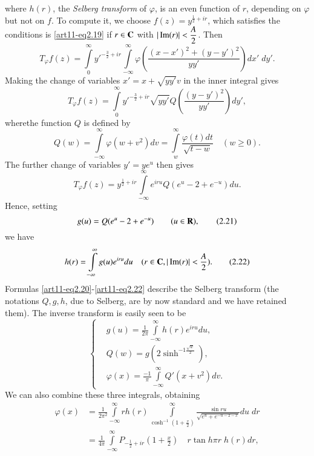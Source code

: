where $h(r)$, the \textit{Selberg transform} of $\varphi$, is an even function of $r$, depending on $\varphi$ but not on $f$. To compute it, we choose $f(z) = y^{\frac{1}{2} + ir}$, which satisfies the conditions is \eqref{art11-eq2.19} if $r \in \mathbf{C}$ with $|\operatorname{Im} (r)| <\dfrac{A}{2}$. Then 
$$
T_\varphi f(z) = \int\limits^\infty_0 y'^{-\frac{3}{2} + ir} \int\limits^\infty_{-\infty} \varphi  \left(\frac{(x-x')^2 + (y-y')^2}{yy'} \right) dx' \; dy'. 
$$
Making the change of variables $x' = x + \sqrt{yy'} v$ in the inner integral gives 
$$
T_\varphi f(z) = \int\limits^\infty_0 y'^{-\frac{3}{2} + ir} \sqrt{yy'} Q \left(\frac{(y-y')^2}{yy'} \right) dy',
$$
where\pageoriginale the function $Q$ is defined by 
\begin{equation*}
Q(w) = \int\limits^\infty_{-\infty} \varphi (w + v^2) dv = \int\limits^\infty_{w}  \frac{\varphi (t) dt}{\sqrt{t -w}} \quad (w \geqslant 0). 
\tag{2.20}\label{art11-eq2.20}
\end{equation*}
The further change of variables $y' = ye^u$ then gives 
$$
T_\varphi f(z) = y^{\frac{1}{2} + ir} \int\limits^\infty_{-\infty} e^{ir u} Q (e^u -2 + e^{-u}) du. 
$$
Hence, setting
\begin{equation*}
g(u) = Q(e^u - 2 + e^{-u}) \qquad (u \in \mathbf{R}), \tag{2.21}\label{art11-eq2.21}
\end{equation*}
we have 
\begin{equation*}
h(r) = \int\limits^\infty_{-\infty} g (u) e^{iru} du \quad (r \in \mathbf{C}, |\operatorname{Im} (r)| < \frac{A}{2}). 
\tag{2.22}\label{art11-eq2.22}
\end{equation*}
Formulas \eqref{art11-eq2.20}-\eqref{art11-eq2.22} describe the Selberg transform (the notations $Q, g, h$, due to Selberg, are by now standard and we have retained them). The inverse transform is easily seen to be 
\begin{equation*}
\left\{
\begin{aligned}
& g (u) = \frac{1}{2 \pi} \int\limits^\infty_{-\infty} h (r) e^{ir u} du, \\
& Q (w) = g (2 \sinh^{-1\frac{\sqrt{w}}{2}}),\\
& \varphi (x) = \frac{-1}{\pi} \int\limits^\infty_{-\infty} Q' (x +
  v^2) dv.
\end{aligned}
\right. \tag{2.23}\label{art11-eq2.23}
\end{equation*}
We can also combine these three integrals, obtaining 
\begin{align*}
\varphi (x) & = \frac{1}{2 \pi^2} \int\limits^\infty_{-\infty} r h (r)
\int\limits^\infty_{\cosh^{-1} (1+\frac{x}{2})} \frac{\sin  ru
}{\sqrt{e^u+ e^{-u - 2 -x}}} du \;dr \\
& = \frac{1}{4 \pi} \int\limits^\infty_{-\infty} P_{-\frac{1}{2} + ir}
(1+ \frac{x}{2}) \quad r \tan h \pi r \; h (r) dr,  \tag{2.24} \label{art11-eq2.24}
\end{align*}
